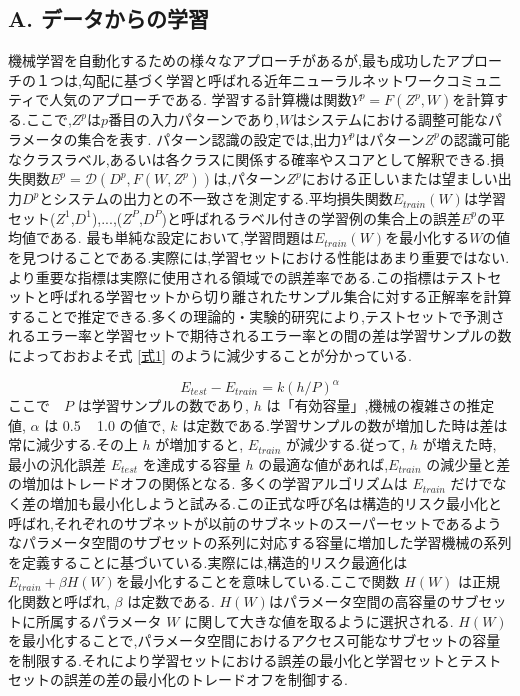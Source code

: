 \documentclass[twocolumn]{jarticle}     %
\begin{document}
\subsection*{A. データからの学習}
機械学習を自動化するための様々なアプローチがあるが,最も成功したアプローチの１つは,勾配に基づく学習と呼ばれる近年ニューラルネットワークコミュニティで人気のアプローチである.
学習する計算機は関数$Y^p = F(Z^p,W)$を計算する.ここで,$Z^p$は$p$番目の入力パターンであり,$W$はシステムにおける調整可能なパラメータの集合を表す.
パターン認識の設定では,出力$Y^p$はパターン$Z^p$の認識可能なクラスラベル,あるいは各クラスに関係する確率やスコアとして解釈できる.損失関数$E^p = \mathcal{D}(D^p,F(W,Z^p))$は,パターン$Z^p$における正しいまたは望ましい出力$D^p$とシステムの出力との不一致さを測定する.平均損失関数$E_{train}(W)$は学習セット{($Z^1$,$D^1$),...,($Z^P$,$D^P$)}と呼ばれるラベル付きの学習例の集合上の誤差$E^p$の平均値である.
最も単純な設定において,学習問題は$E_{train}(W)$を最小化する$W$の値を見つけることである.実際には,学習セットにおける性能はあまり重要ではない.より重要な指標は実際に使用される領域での誤差率である.この指標はテストセットと呼ばれる学習セットから切り離されたサンプル集合に対する正解率を計算することで推定できる.多くの理論的・実験的研究\cite{3,4,5}により,テストセットで予測されるエラー率と学習セットで期待されるエラー率との間の差は学習サンプルの数によっておおよそ式 \ref{式1} のように減少することが分かっている. 

\begin{equation}
  E_{test} - E_{train} = k({h}/{P})^\alpha
  \label{式1}
\end{equation}
ここで　$P$ は学習サンプルの数であり, 
$h$ は「有効容量」,機械の複雑さの推定値, $\alpha$ は 0.5 ~ 1.0 の値で, $k$ は定数である.学習サンプルの数が増加した時は差は常に減少する.その上 $h$ が増加すると, $E_{train}$ が減少する.従って, $h$ が増えた時, 最小の汎化誤差 $E_{test}$ を達成する容量 $h$ の最適な値があれば,$E_{train}$ の減少量と差の増加はトレードオフの関係となる.
多くの学習アルゴリズムは $E_{train}$ だけでなく差の増加も最小化しようと試みる.この正式な呼び名は構造的リスク最小化と呼ばれ,それぞれのサブネットが以前のサブネットのスーパーセットであるようなパラメータ空間のサブセットの系列に対応する容量に増加した学習機械の系列を定義することに基づいている.実際には,構造的リスク最適化は $E_{train} + \beta H(W)$を最小化することを意味している.ここで関数 $H(W)$ は正規化関数と呼ばれ, $\beta$ は定数である. $H(W)$はパラメータ空間の高容量のサブセットに所属するパラメータ $W$ に関して大きな値を取るように選択される. $H(W)$ を最小化することで,パラメータ空間におけるアクセス可能なサブセットの容量を制限する.それにより学習セットにおける誤差の最小化と学習セットとテストセットの誤差の差の最小化のトレードオフを制御する.
\end{document}
